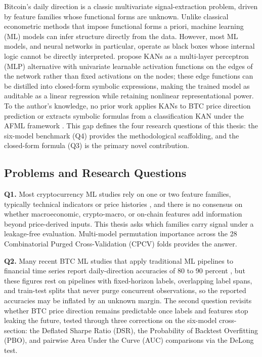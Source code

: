 
Bitcoin's daily direction is a classic multivariate signal-extraction problem, driven by feature families whose functional forms are unknown. Unlike classical econometric methods that impose functional forms a priori, machine learning (ML) models can infer structure directly from the data. However, most ML models, and neural networks in particular, operate as black boxes whose internal logic cannot be directly interpreted. \citet{liu_kan_2024} propose KANs as a multi-layer perceptron (MLP) alternative with univariate learnable activation functions on the edges of the network rather than fixed activations on the nodes; these edge functions can be distilled into closed-form symbolic expressions, making the trained model as auditable as a linear regression while retaining nonlinear representational power. To the author's knowledge, no prior work applies KANs to BTC price direction prediction or extracts symbolic formulas from a classification KAN under the AFML framework \citep{lopez_de_prado_2018}. This gap defines the four research questions of this thesis: the six-model benchmark (Q4) provides the methodological scaffolding, and the closed-form formula (Q3) is the primary novel contribution.


\subsection{Problems and Research Questions}\label{subsec:objectives}

\textbf{Q1.} Most cryptocurrency ML studies rely on one or two feature families, typically technical indicators or price histories \citep{bourday_crypto_dl_2024}, and there is no consensus on whether macroeconomic, crypto-macro, or on-chain features add information beyond price-derived inputs. This thesis asks which families carry signal under a leakage-free evaluation. Multi-model permutation importance across the 28 Combinatorial Purged Cross-Validation (CPCV) folds provides the answer.

\textbf{Q2.} Many recent BTC ML studies that apply traditional ML pipelines to financial time series report daily-direction accuracies of 80 to 90 percent \citep{omole_enke_2024}, but these figures rest on pipelines with fixed-horizon labels, overlapping label spans, and train-test splits that never purge concurrent observations, so the reported accuracies may be inflated by an unknown margin. The second question revisits whether BTC price direction remains predictable once labels and features stop leaking the future, tested through three corrections on the six-model cross-section: the Deflated Sharpe Ratio (DSR), the Probability of Backtest Overfitting (PBO), and pairwise Area Under the Curve (AUC) comparisons via the DeLong test.

